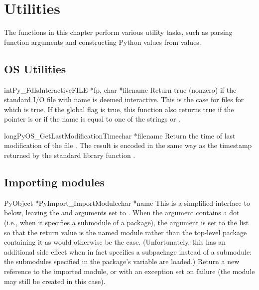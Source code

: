 \documentclass[twoside,openright]{report}
\begin{document}
\chapter{Utilities}

The functions in this chapter perform various utility tasks, such as
parsing function arguments and constructing Python values from \C{}
values.

\section{OS Utilities}

\begin{cfuncdesc}{int}{Py_FdIsInteractive}{FILE *fp, char *filename}
Return true (nonzero) if the standard I/O file  with name
 is deemed interactive.  This is the case for files for
which  is true.  If the global flag
 is true, this function also returns true if
the  pointer is \NULL{} or if the name is equal to one of
the strings  or .
\end{cfuncdesc}

\begin{cfuncdesc}{long}{PyOS_GetLastModificationTime}{char *filename}
Return the time of last modification of the file .
The result is encoded in the same way as the timestamp returned by
the standard \C{} library function .
\end{cfuncdesc}


\section{Importing modules}

\begin{cfuncdesc}{PyObject *}{PyImport_ImportModule}{char *name}
This is a simplified interface to 
below, leaving the  and  arguments set to
\NULL{}.  When the  argument contains a dot (i.e., when
it specifies a submodule of a package), the  argument is
set to the list \code{['*']} so that the return value is the named
module rather than the top-level package containing it as would
otherwise be the case.  (Unfortunately, this has an additional side
effect when  in fact specifies a subpackage instead of a
submodule: the submodules specified in the package's 
variable are loaded.)  Return a new reference to the imported module,
or \NULL{} with an exception set on failure (the module may still
be created in this case).
\end{cfuncdesc}
\end{document}
